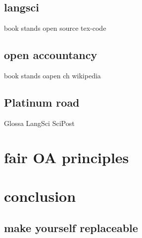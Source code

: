 \documentclass[12pt]{article}
\newcommand\wordcount{}
\begin{document}
\subsection{langsci} 
            book stands
            open source
            tex-code
\subsection{open accountancy} 
 {book stands}
 {oapen ch}
 {wikipedia}
            
\subsection{Platinum road}
            Glossa
            LangSci
            SciPost
\section{fair OA principles}
\section{conclusion} 
\subsection{make yourself replaceable}


\sloppy
\printbibliography


\wordcount
\end{document}
